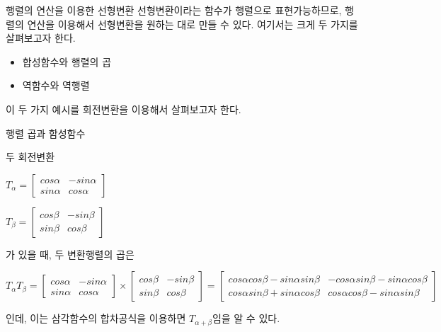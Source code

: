\documentclass{beamer}
\begin{document}
\begin{frame}{행렬의 연산을 이용한 선형변환}
선형변환이라는 함수가 행렬으로 표현가능하므로, 행렬의 연산을 이용해서 선형변환을 원하는 대로 만들 수 있다. 여기서는 크게 두 가지를 살펴보고자 한다. 

\begin{itemize} 
\item 합성함수와 행렬의 곱 
\item 역함수와 역행렬
\end{itemize}

이 두 가지 예시를 회전변환을 이용해서 살펴보고자 한다. 

\end{frame}

\begin{frame}{행렬 곱과 함성함수 } 

두 회전변환 

$T_{\alpha} = 
\left[ \begin{matrix}
cos \alpha & - sin \alpha  \\
sin \alpha & cos \alpha 
\end{matrix} \right] $

$T_{\beta} = 
\left[ \begin{matrix}
cos \beta & - sin \beta  \\
sin \beta & cos \beta 
\end{matrix} \right] $

가 있을 때, 두 변환행렬의 곱은 


$T_{\alpha} T_{\beta}  = 
\left[ \begin{matrix}
cos \alpha & - sin \alpha  \\
sin \alpha & cos \alpha 
\end{matrix} \right] \times 
\left[ \begin{matrix}
cos \beta & - sin \beta  \\
sin \beta & cos \beta 
\end{matrix} \right] = 
\left[ \begin{matrix}
cos \alpha cos \beta - sin \alpha sin \beta  & - cos \alpha sin \beta - sin \alpha cos \beta  \\
cos \alpha sin \beta + sin \alpha cos \beta  & cos \alpha cos \beta - sin \alpha sin \beta
\end{matrix} \right] 
 $
 
인데, 이는 삼각함수의 합차공식을 이용하면 $T_{\alpha + \beta}$임을 알 수 있다. 

\end{frame}
\end{document}
